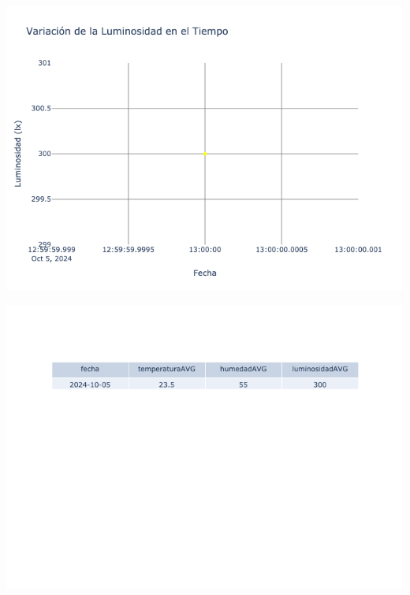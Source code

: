 \documentclass{article}
\begin{document}
    \noindent
    \begin{minipage}{0.48\textwidth}
        \centering
        \includegraphics[width=\textwidth]{../img/poli/LS203-90Dias-03-12-2024.png}
    \end{minipage}
    \hfill
    \begin{minipage}{0.48\textwidth}
        \centering
        \includegraphics[width=\textwidth]{../img/tables/CAVG203-90Dias-03-12-2024.png}
    \end{minipage}
    
\end{document}
